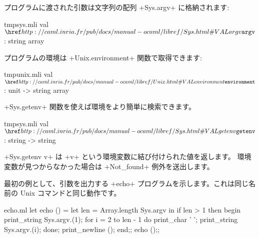 プログラムに渡された引数は文字列の配列 \ml+Sys.argv+ に格納されます:
%
\begin{listingcodefile}{tmpsys.mli}
val $\indexlibvalue{Sys}{argv}$ : string array
\end{listingcodefile}
%
プログラムの環境は \ml+Unix.environment+ 関数で取得できます:
%
\begin{listingcodefile}{tmpunix.mli}
val $\indexlibvalue{Unix}{environment}$ : unit -> string array
\end{listingcodefile}
%
\ml+Sys.getenv+ 関数を使えば環境をより簡単に検索できます。
%
\begin{listingcodefile}{tmpsys.mli}
val $\indexlibvalue{Sys}{getenv}$ : string -> string
\end{listingcodefile}
%
\ml+Sys.getenv v+ は \ml+v+ という環境変数に結び付けられた値を返します。
環境変数が見つからなかった場合は \ml+Not_found+ 例外を送出します。
%
\begin{example}
最初の例として、引数を出力する \ml+echo+ プログラムを示します。これは同じ名前の Unix コマンドと同じ動作です。
\begin{listingcodefile}{echo.ml}
let echo () =
  let len = Array.length Sys.argv in
  if len > 1 then
    begin
      print_string Sys.argv.(1);
      for i = 2 to len - 1 do
        print_char ' ';
        print_string Sys.argv.(i);
      done;
      print_newline ();
    end;;
echo ();;
\end{listingcodefile}
\end{example}

